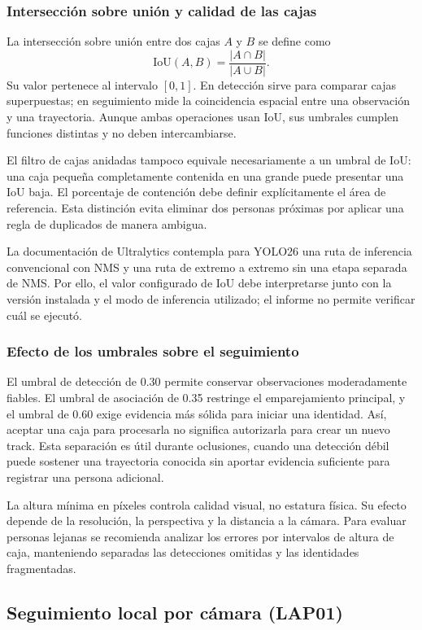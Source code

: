 \documentclass[12pt,letterpaper]{article}
\begin{document}
\subsubsection{Intersección sobre unión y calidad de las cajas}
La intersección sobre unión entre dos cajas $A$ y $B$ se define como
\[
 \mathrm{IoU}(A,B)=\frac{|A\cap B|}{|A\cup B|}.
\]
Su valor pertenece al intervalo $[0,1]$. En detección sirve para comparar cajas superpuestas; en seguimiento mide la coincidencia espacial entre una observación y una trayectoria. Aunque ambas operaciones usan IoU, sus umbrales cumplen funciones distintas y no deben intercambiarse.

El filtro de cajas anidadas tampoco equivale necesariamente a un umbral de IoU: una caja pequeña completamente contenida en una grande puede presentar una IoU baja. El porcentaje de contención debe definir explícitamente el área de referencia. Esta distinción evita eliminar dos personas próximas por aplicar una regla de duplicados de manera ambigua.

La documentación de Ultralytics contempla para YOLO26 una ruta de inferencia convencional con NMS y una ruta de extremo a extremo sin una etapa separada de NMS. Por ello, el valor configurado de IoU debe interpretarse junto con la versión instalada y el modo de inferencia utilizado; el informe no permite verificar cuál se ejecutó.

\subsubsection{Efecto de los umbrales sobre el seguimiento}
El umbral de detección de 0.30 permite conservar observaciones moderadamente fiables. El umbral de asociación de 0.35 restringe el emparejamiento principal, y el umbral de 0.60 exige evidencia más sólida para iniciar una identidad. Así, aceptar una caja para procesarla no significa autorizarla para crear un nuevo track. Esta separación es útil durante oclusiones, cuando una detección débil puede sostener una trayectoria conocida sin aportar evidencia suficiente para registrar una persona adicional.

La altura mínima en píxeles controla calidad visual, no estatura física. Su efecto depende de la resolución, la perspectiva y la distancia a la cámara. Para evaluar personas lejanas se recomienda analizar los errores por intervalos de altura de caja, manteniendo separadas las detecciones omitidas y las identidades fragmentadas.


\subsection{Seguimiento local por cámara (LAP01)}
\end{document}
